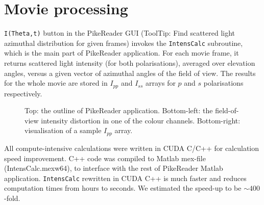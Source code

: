 \documentclass[preprint,review,12pt,dvips]{elsarticle}
\begin{document}
\section{Movie processing}
\texttt{I(Theta,t)} button in the PikeReader GUI (ToolTip: Find scattered light azimuthal distribution for given frames)
invokes the \texttt{IntensCalc} subroutine, which is the main part of PikeReader application. For each movie frame, it
returns scattered light intensity (for both polarisations), averaged over elevation angles, versus a given vector of
azimuthal angles of the field of view. The results for the whole movie are stored in $I_{pp}$ and $I_{ss}$ arrays for $p$
and $s$ polarisations respectively.
\begin{figure}[h!t!b!]
\caption{Top: the outline of PikeReader application. Bottom-left: the field-of-view intensity distortion in one of the
colour channels. Bottom-right: visualisation of a sample $I_{pp}$ array.}\label{code+results}
\end{figure}
All compute-intensive calculations were written in CUDA C/C++ for calculation speed improvement. C++ code was compiled to
Matlab mex-file (IntensCalc.mexw64), to interface with the rest of PikeReader Matlab application. \texttt{IntensCalc}
rewritten in CUDA C++ is much faster and reduces computation times from hours to seconds. We estimated the speed-up to be
$\sim 400$-fold.
\end{document}
